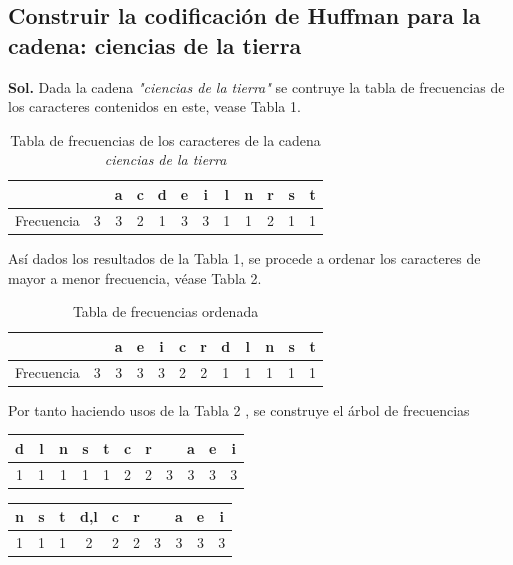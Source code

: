 \documentclass[12pt,twoside]{article}
\begin{document}
    \subsection{Construir la codificación de Huffman para la cadena: ciencias de la tierra}
    {\bf Sol.}
    Dada la cadena {\it "ciencias de la tierra"} se contruye la tabla de frecuencias de los caracteres contenidos en este, vease Tabla 1.
    \begin{longtable}{|c|c|c|c|c|c|c|c|c|c|c|c|}
        \caption{Tabla de frecuencias de los caracteres de la cadena {\it ciencias de la tierra}}\\
        \hline
             &{}&{a}&{c}&{d}&{e}&{i}&{l}&{n}&{r}&{s}&{t}\\
        \hline
            {Frecuencia}&{3}&{3}&{2}&{1}&{3}&{3}&{1}&{1}&{2}&{1}&{1}\\
        \hline
    \end{longtable}
    As\'i dados los resultados de la Tabla 1, se procede a ordenar los caracteres de mayor a menor frecuencia, v\'ease Tabla 2.
    \begin{longtable}{|c|c|c|c|c|c|c|c|c|c|c|c|}
        \caption{Tabla de frecuencias ordenada}\\
        \hline
             &{}&{a}&{e}&{i}&{c}&{r}&{d}&{l}&{n}&{s}&{t}\\
        \hline
            {Frecuencia}&{3}&{3}&{3}&{3}&{2}&{2}&{1}&{1}&{1}&{1}&{1}\\
        \hline
    \end{longtable}
    Por tanto haciendo usos de la Tabla 2 , se construye el \'arbol de frecuencias
    \begin{longtable}{|c|c|c|c|c|c|c|c|c|c|c|}
        \hline
            {d}&{l}&{n}&{s}&{t}&{c}&{r}&{ }&{a}&{e}&{i}\\
        \hline
            {1}&{1}&{1}&{1}&{1}&{2}&{2}&{3}&{3}&{3}&{3}\\
        \hline
    \end{longtable}
    \begin{center}
    \end{center}
    \begin{longtable}{|c|c|c|c|c|c|c|c|c|c|}
        \hline
            {n}&{s}&{t}&{d,l}&{c}&{r}&{ }&{a}&{e}&{i}\\
        \hline
            {1}&{1}&{1}&{2}&{2}&{2}&{3}&{3}&{3}&{3}\\
        \hline
    \end{longtable}
\end{document}
